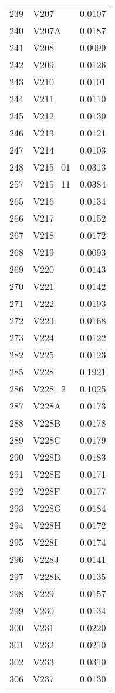 \documentclass{amsart}
\begin{document}
\begin{longtable}{rlr}
  239 & V207 & 0.0107 \\ 
  240 & V207A & 0.0187 \\ 
  241 & V208 & 0.0099 \\ 
  242 & V209 & 0.0126 \\ 
  243 & V210 & 0.0101 \\ 
  244 & V211 & 0.0110 \\ 
  245 & V212 & 0.0130 \\ 
  246 & V213 & 0.0121 \\ 
  247 & V214 & 0.0103 \\ 
  248 & V215\_01 & 0.0313 \\ 
  257 & V215\_11 & 0.0384 \\ 
  265 & V216 & 0.0134 \\ 
  266 & V217 & 0.0152 \\ 
  267 & V218 & 0.0172 \\ 
  268 & V219 & 0.0093 \\ 
  269 & V220 & 0.0143 \\ 
  270 & V221 & 0.0142 \\ 
  271 & V222 & 0.0193 \\ 
  272 & V223 & 0.0168 \\ 
  273 & V224 & 0.0122 \\ 
  282 & V225 & 0.0123 \\ 
  285 & V228 & 0.1921 \\ 
  286 & V228\_2 & 0.1025 \\ 
  287 & V228A & 0.0173 \\ 
  288 & V228B & 0.0178 \\ 
  289 & V228C & 0.0179 \\ 
  290 & V228D & 0.0183 \\ 
  291 & V228E & 0.0171 \\ 
  292 & V228F & 0.0177 \\ 
  293 & V228G & 0.0184 \\ 
  294 & V228H & 0.0172 \\ 
  295 & V228I & 0.0174 \\ 
  296 & V228J & 0.0141 \\ 
  297 & V228K & 0.0135 \\ 
  298 & V229 & 0.0157 \\ 
  299 & V230 & 0.0134 \\ 
  300 & V231 & 0.0220 \\ 
  301 & V232 & 0.0210 \\ 
  302 & V233 & 0.0310 \\ 
  306 & V237 & 0.0130 \\ 

\end{longtable}
\end{document}
